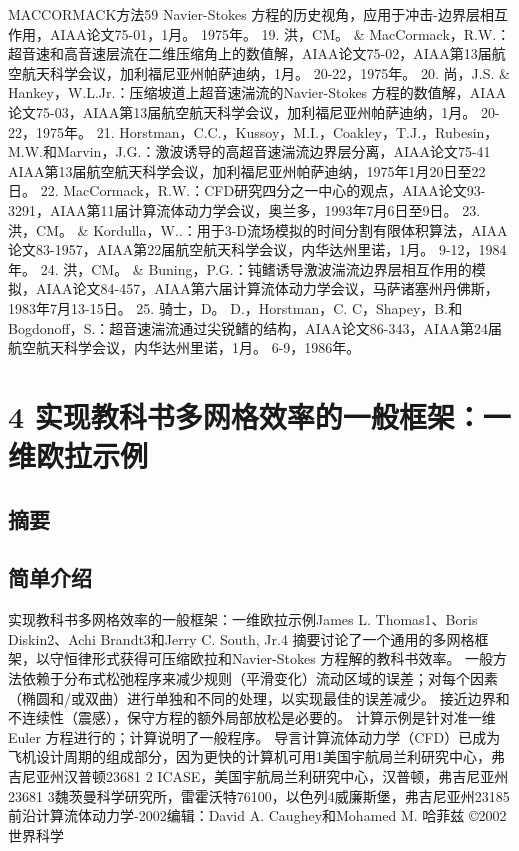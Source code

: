 \documentclass[UTF8,11pt,a4paper,openany,fontset=fandol]{ctexbook}
\begin{document}
MACCORMACK方法59 Navier-Stokes 方程的历史视角，应用于冲击-边界层相互作用，AIAA论文75-01，1月。 1975年。 19. 洪，CM。 \& MacCormack，R.W.：超音速和高音速层流在二维压缩角上的数值解，AIAA论文75-02，AIAA第13届航空航天科学会议，加利福尼亚州帕萨迪纳，1月。 20-22，1975年。 20. 尚，J.S. \& Hankey，W.L.Jr.：压缩坡道上超音速湍流的Navier-Stokes 方程的数值解，AIAA论文75-03，AIAA第13届航空航天科学会议，加利福尼亚州帕萨迪纳，1月。 20-22，1975年。 21. Horstman，C.C.，Kussoy，M.I.，Coakley，T.J.，Rubesin，M.W.和Marvin，J.G.：激波诱导的高超音速湍流边界层分离，AIAA论文75-41 AIAA第13届航空航天科学会议，加利福尼亚州帕萨迪纳，1975年1月20日至22日。 22. MacCormack，R.W.：CFD研究四分之一中心的观点，AIAA论文93-3291，AIAA第11届计算流体动力学会议，奥兰多，1993年7月6日至9日。 23. 洪，CM。 \& Kordulla，W..：用于3-D流场模拟的时间分割有限体积算法，AIAA论文83-1957，AIAA第22届航空航天科学会议，内华达州里诺，1月。 9-12，1984年。 24. 洪，CM。 \& Buning，P.G.：钝鳍诱导激波湍流边界层相互作用的模拟，AIAA论文84-457，AIAA第六届计算流体动力学会议，马萨诸塞州丹佛斯，1983年7月13-15日。 25. 骑士，D。 D.，Horstman，C. C，Shapey，B.和Bogdonoff，S.：超音速湍流通过尖锐鳍的结构，AIAA论文86-343，AIAA第24届航空航天科学会议，内华达州里诺，1月。 6-9，1986年。

\clearpage
\chapter{4 实现教科书多网格效率的一般框架：一维欧拉示例}
\section{摘要}
\section{简单介绍}
实现教科书多网格效率的一般框架：一维欧拉示例James L. Thomas1、Boris Diskin2、Achi Brandt3和Jerry C. South, Jr.4 摘要讨论了一个通用的多网格框架，以守恒律形式获得可压缩欧拉和Navier-Stokes 方程解的教科书效率。 一般方法依赖于分布式松弛程序来减少规则（平滑变化）流动区域的误差；对每个因素（椭圆和/或双曲）进行单独和不同的处理，以实现最佳的误差减少。 接近边界和不连续性（震感），保守方程的额外局部放松是必要的。 计算示例是针对准一维Euler 方程进行的；计算说明了一般程序。 导言计算流体动力学（CFD）已成为飞机设计周期的组成部分，因为更快的计算机可用1美国宇航局兰利研究中心，弗吉尼亚州汉普顿23681 2 ICASE，美国宇航局兰利研究中心，汉普顿，弗吉尼亚州23681 3魏茨曼科学研究所，雷霍沃特76100，以色列4威廉斯堡，弗吉尼亚州23185前沿计算流体动力学-2002编辑：David A. Caughey和Mohamed M. 哈菲兹 ©2002 世界科学
\end{document}
